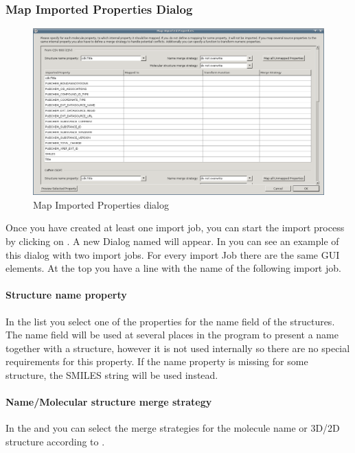 \subsubsection{Map Imported Properties Dialog}
\begin{figure}[ht]
   \centering
   \includegraphics[width=\textwidth]{images/import/mapdialog_empty.png}
   \caption{Map Imported Properties dialog}
   \label{fig:mapdialog_empty}
\end{figure}
Once you have created at least one import job, you can start the import process
by clicking on . A new Dialog named  will appear. In  you can see an
example of this dialog with two import jobs. For every import Job there are the
same GUI elements. At the top you have a line with the name of the following import job.
\paragraph{Structure name property}
In the  list you select one of the properties for
the name field of the structures. The name field will be used at several places
in the program to present a name together with a structure, however it is not
used internally so there are no special requirements for this property. If the
name property is missing for some structure, the SMILES string will be used
instead.
\paragraph{Name/Molecular structure merge strategy}
In the  and 
you can select the merge strategies for the molecule name or 3D/2D structure
according to . 
